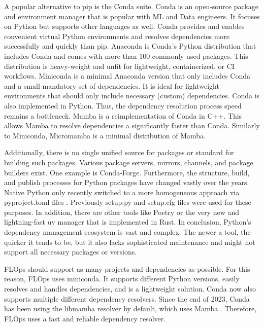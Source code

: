A popular alternative to pip is the Conda suite.
Conda \cite{docs:conda} is an open-source package and environment manager that is popular with ML and Data engineers.
It focuses on Python but supports other languages as well.
Conda provides and enables convenient virtual Python environments and resolves dependencies more successfully and quickly than pip.
Anaconda \cite{docs:anaconda} is Conda's Python distribution that includes Conda and comes with more than 100 commonly used packages.
This distribution is heavy-weight and unfit for lightweight, containerized, or CI workflows.
Miniconda \cite{docs:miniconda} is a minimal Anaconda version that only includes Conda and a small mandatory set of dependencies.
It is ideal for lightweight environments that should only include necessary (custom) dependencies.
Conda is also implemented in Python.
Thus, the dependency resolution process speed remains a bottleneck.
Mamba \cite{docs:mamba} is a reimplementation of Conda in C++.
This allows Mamba to resolve dependencies a significantly faster than Conda.
Similarly to Miniconda, Micromamba \cite{docs:micromamba} is a minimal distribution of Mamba.

Additionally, there is no single unified source for packages or standard for building such packages.
Various package servers, mirrors, channels, and package builders exist.
One example is Conda-Forge.
Furthermore, the structure, build, and publish processes for Python packages have changed vastly over the years.
Native Python only recently switched to a more homogeneous approach via pyproject.toml files \cite{setuptools_userguide}.
Previously setup.py and setup.cfg files were used for these purposes.
In addition, there are other tools like Poetry \cite{docs:poetry} or the very new and lightning-fast uv \cite{uv} manager that is implemented in Rust.
In conclusion, Python's dependency management ecosystem is vast and complex.
The newer a tool, the quicker it tends to be, but it also lacks sophisticated maintenance and might not support all necessary packages or versions.

FLOps should support as many projects and dependencies as possible.
For this reason, FLOps uses miniconda.
It supports different Python versions, easily resolves and handles dependencies, and is a lightweight solution.
Conda now also supports multiple different dependency resolvers.
Since the end of 2023, Conda has been using the libmamba resolver by default, which uses Mamba \cite{docs:conda_libmamba}.
Therefore, FLOps uses a fast and reliable dependency resolver.

